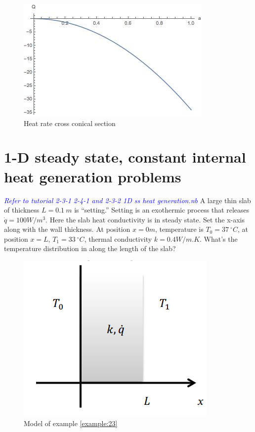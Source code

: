 \begin{solution}
\begin{enumerate}
\begin{figure}[H]
  \centering
    \includegraphics[scale=1]{figures/ch2/5}
    \caption{Heat rate cross conical section}
    \label{fig:2:5}
\end{figure}

\end{enumerate}
\end{solution}

\section{1-D steady state, constant	internal heat generation problems}
\begin{example}
\label{example:23}
\textcolor{blue} {\emph{Refer to tutorial 2-3-1 2-4-1 and 2-3-2 1D ss heat generation.nb}}
A large thin slab of thickness $L=0.1~m$ is “setting.” Setting is an exothermic process 
that releases $\dot{q}=100W/m^3$. Here the slab heat conductivity is in steady state. 
Set the x-axis along with the wall thickness. At position $x=0m$, temperature is $T_0=37~^\circ C$,
at position $x=L$, $T_1=33~^\circ C$, thermal conductivity $k=0.4W/m.K$. What’s the
temperature distribution in along the length of the slab? 
\begin{figure}[H]
  \centering
    \includegraphics[scale=0.6]{figures/ch2/6}
    \caption{Model of example \ref{example:23}}
    \label{fig:2:6}
\end{figure}
\end{example}

